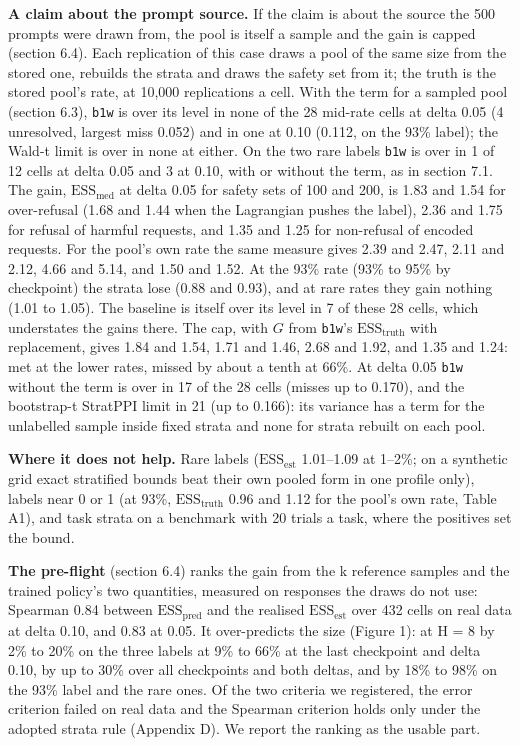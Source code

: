 \documentclass[11pt]{article}
\begin{document}
\textbf{A claim about the prompt source.} If the claim is about the source the 500 prompts were drawn from, the pool is itself a sample and the gain is capped (section 6.4). Each replication of this case draws a pool of the same size from the stored one, rebuilds the strata and draws the safety set from it; the truth is the stored pool's rate, at 10,000 replications a cell. With the term for a sampled pool (section 6.3), \texttt{b1w} is over its level in none of the 28 mid-rate cells at delta 0.05 (4 unresolved, largest miss 0.052) and in one at 0.10 (0.112, on the 93\% label); the Wald-t limit is over in none at either. On the two rare labels \texttt{b1w} is over in 1 of 12 cells at delta 0.05 and 3 at 0.10, with or without the term, as in section 7.1. The gain, $\mathrm{ESS}_{\mathrm{med}}$ at delta 0.05 for safety sets of 100 and 200, is 1.83 and 1.54 for over-refusal (1.68 and 1.44 when the Lagrangian pushes the label), 2.36 and 1.75 for refusal of harmful requests, and 1.35 and 1.25 for non-refusal of encoded requests. For the pool's own rate the same measure gives 2.39 and 2.47, 2.11 and 2.12, 4.66 and 5.14, and 1.50 and 1.52. At the 93\% rate (93\% to 95\% by checkpoint) the strata lose (0.88 and 0.93), and at rare rates they gain nothing (1.01 to 1.05). The baseline is itself over its level in 7 of these 28 cells, which understates the gains there. The cap, with $G$ from \texttt{b1w}'s $\mathrm{ESS}_{\mathrm{truth}}$ with replacement, gives 1.84 and 1.54, 1.71 and 1.46, 2.68 and 1.92, and 1.35 and 1.24: met at the lower rates, missed by about a tenth at 66\%. At delta 0.05 \texttt{b1w} without the term is over in 17 of the 28 cells (misses up to 0.170), and the bootstrap-t StratPPI limit in 21 (up to 0.166): its variance has a term for the unlabelled sample inside fixed strata and none for strata rebuilt on each pool.


\textbf{Where it does not help.} Rare labels ($\mathrm{ESS}_{\mathrm{est}}$ 1.01--1.09 at 1--2\%; on a synthetic grid exact stratified bounds beat their own pooled form in one profile only), labels near 0 or 1 (at 93\%, $\mathrm{ESS}_{\mathrm{truth}}$ 0.96 and 1.12 for the pool's own rate, Table A1), and task strata on a benchmark with 20 trials a task, where the positives set the bound.


\textbf{The pre-flight} (section 6.4) ranks the gain from the k reference samples and the trained policy's two quantities, measured on responses the draws do not use: Spearman 0.84 between $\mathrm{ESS}_{\mathrm{pred}}$ and the realised $\mathrm{ESS}_{\mathrm{est}}$ over 432 cells on real data at delta 0.10, and 0.83 at 0.05. It over-predicts the size (Figure 1): at H = 8 by 2\% to 20\% on the three labels at 9\% to 66\% at the last checkpoint and delta 0.10, by up to 30\% over all checkpoints and both deltas, and by 18\% to 98\% on the 93\% label and the rare ones. Of the two criteria we registered, the error criterion failed on real data and the Spearman criterion holds only under the adopted strata rule (Appendix D). We report the ranking as the usable part.
\end{document}
